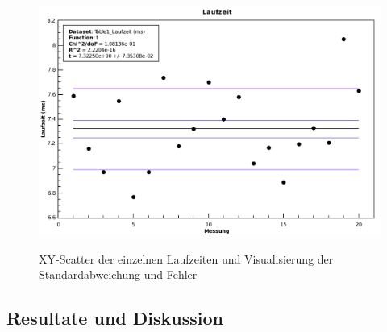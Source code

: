 \begin{figure}[h!]
    \caption{XY-Scatter der einzelnen Laufzeiten und Visualisierung der Standardabweichung und Fehler}
    \includegraphics[width=\textwidth]{qtiplot/schallgeschwindigkeit}
    \label{fig:schallgeschwindigkeit}
\end{figure}




\subsection{Resultate und Diskussion}


